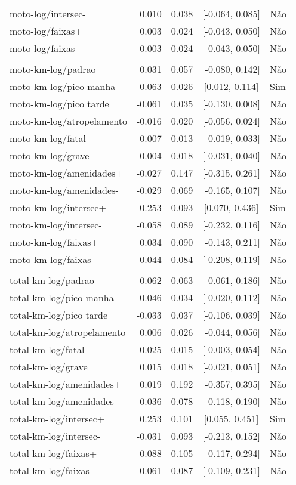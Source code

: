 \begin{longtable}{lrrcl}
moto-log/intersec- & 0.010 & 0.038 & {}[-0.064, 0.085] & Não\\
moto-log/faixas+ & 0.003 & 0.024 & {}[-0.043, 0.050] & Não\\
moto-log/faixas- & 0.003 & 0.024 & {}[-0.043, 0.050] & Não\\
 &  &  &  & \\
moto-km-log/padrao & 0.031 & 0.057 & {}[-0.080, 0.142] & Não\\
moto-km-log/pico manha & 0.063 & 0.026 & {}[0.012, 0.114] & Sim\\
moto-km-log/pico tarde & -0.061 & 0.035 & {}[-0.130, 0.008] & Não\\
moto-km-log/atropelamento & -0.016 & 0.020 & {}[-0.056, 0.024] & Não\\
moto-km-log/fatal & 0.007 & 0.013 & {}[-0.019, 0.033] & Não\\
moto-km-log/grave & 0.004 & 0.018 & {}[-0.031, 0.040] & Não\\
moto-km-log/amenidades+ & -0.027 & 0.147 & {}[-0.315, 0.261] & Não\\
moto-km-log/amenidades- & -0.029 & 0.069 & {}[-0.165, 0.107] & Não\\
moto-km-log/intersec+ & 0.253 & 0.093 & {}[0.070, 0.436] & Sim\\
moto-km-log/intersec- & -0.058 & 0.089 & {}[-0.232, 0.116] & Não\\
moto-km-log/faixas+ & 0.034 & 0.090 & {}[-0.143, 0.211] & Não\\
moto-km-log/faixas- & -0.044 & 0.084 & {}[-0.208, 0.119] & Não\\
 &  &  &  & \\
total-km-log/padrao & 0.062 & 0.063 & {}[-0.061, 0.186] & Não\\
total-km-log/pico manha & 0.046 & 0.034 & {}[-0.020, 0.112] & Não\\
total-km-log/pico tarde & -0.033 & 0.037 & {}[-0.106, 0.039] & Não\\
total-km-log/atropelamento & 0.006 & 0.026 & {}[-0.044, 0.056] & Não\\
total-km-log/fatal & 0.025 & 0.015 & {}[-0.003, 0.054] & Não\\
total-km-log/grave & 0.015 & 0.018 & {}[-0.021, 0.051] & Não\\
total-km-log/amenidades+ & 0.019 & 0.192 & {}[-0.357, 0.395] & Não\\
total-km-log/amenidades- & 0.036 & 0.078 & {}[-0.118, 0.190] & Não\\
total-km-log/intersec+ & 0.253 & 0.101 & {}[0.055, 0.451] & Sim\\
total-km-log/intersec- & -0.031 & 0.093 & {}[-0.213, 0.152] & Não\\
total-km-log/faixas+ & 0.088 & 0.105 & {}[-0.117, 0.294] & Não\\
total-km-log/faixas- & 0.061 & 0.087 & {}[-0.109, 0.231] & Não\\*
\end{longtable}
